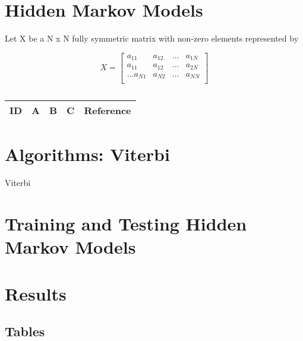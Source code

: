 \section{Hidden Markov Models}

Let X be a N x N fully symmetric matrix with non-zero elements represented by 

\begin{equation}
X=
\begin{bmatrix}
a_{11} & a_{12} & ... & a_{1N} \\
a_{11} & a_{12} & ... & a_{2N} \\
.
.
.
a_{N1} & a_{N2} & ... & a_{NN} \\
\end{bmatrix}
\end{equation}


\centering
\begin{table}[H]\footnotesize
	\caption{}
	\begin{tabular}{rp{1cm}p{2cm}p{3cm}p{1cm}}
		\hline
		ID & A & B & C & Reference \\
		\hline
		\hline
	\end{tabular}
\end{table}
\raggedright

\section{Algorithms: Viterbi}

\begin{algorithm}[H]
	\footnotesize
	\begin{algorithmic}[1]
	\State 
	\end{algorithmic}
	\caption{Viterbi}\label{Viterbi_1}
\end{algorithm}


\section{Training and Testing Hidden Markov Models}

\section{Results}

\begin{enumerate}
\end{enumerate}

\subsection{Tables}

